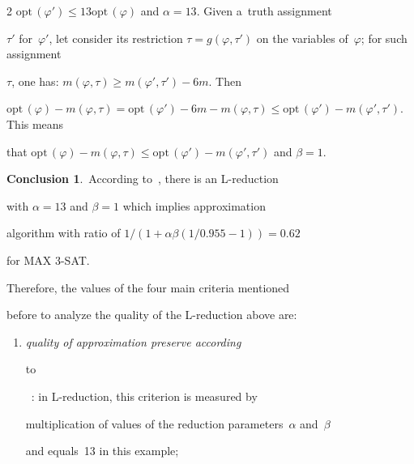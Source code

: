 \begin{multicols}{2}
$\mathrm{opt}\,(\varphi')


\leq 13\mathrm{opt}\,(\varphi)$ and $\alpha = 13$. Given a~truth assignment


$\tau'$ for~$\varphi'$, let consider its restriction $\tau =


g(\varphi,\tau')$ on the variables of~$\varphi$; for such assignment


$\tau$, one has: $m(\varphi,\tau) \geq m(\varphi',\tau') - 6m$. Then


$\mathrm{opt}\,(\varphi) - m(\varphi,\tau)$\linebreak $ = \mathrm{opt}\,(\varphi') - 6m -


m(\varphi,\tau) \leq \mathrm{opt}\,(\varphi') - m(\varphi',\tau')$. This means


that $\mathrm{opt}\,(\varphi) - m(\varphi,\tau) \leq \mathrm{opt}\,(\varphi') -


m(\varphi',\tau')$ and $\beta = 1$.





\smallskip





\noindent


\textbf{Conclusion 1}.\ According to~\cite{AP2005}, there is an L-reduction


with $\alpha=13$ and $\beta=1$ which implies approximation


algorithm with ratio of $1/(1+\alpha\beta (1/0.955-1)) = 0.62$


for MAX 3-SAT.





\smallskip





Therefore, the values of the four main criteria mentioned


before to analyze the quality of the L-reduction above are:


\begin{enumerate}[(1)]


\item {\it quality of approximation preserve according


to}~\cite{AP2005}: in L-reduction, this criterion is measured by


multiplication of values of the reduction parameters~$\alpha$ and~$\beta$


and equals~13 in this example;



\end{enumerate}
\end{multicols}
